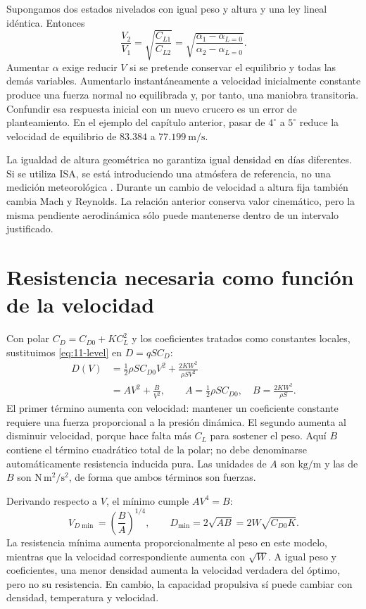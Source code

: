 Supongamos dos estados nivelados con igual peso y altura y una ley lineal idéntica. Entonces
\begin{equation}\label{eq:11-alphav}
\frac{V_2}{V_1}=\sqrt{\frac{C_{L1}}{C_{L2}}}
=\sqrt{\frac{\alpha_1-\alpha_{L=0}}{\alpha_2-\alpha_{L=0}}}.
\end{equation}
Aumentar $\alpha$ exige reducir $V$ si se pretende conservar el equilibrio y todas las demás variables. Aumentarlo instantáneamente a velocidad inicialmente constante produce una fuerza normal no equilibrada y, por tanto, una maniobra transitoria. Confundir esa respuesta inicial con un nuevo crucero es un error de planteamiento. En el ejemplo del capítulo anterior, pasar de $4^\circ$ a $5^\circ$ reduce la velocidad de equilibrio de $83.384$ a $77.199\ \mathrm{m/s}$.

La igualdad de altura geométrica no garantiza igual densidad en días diferentes. Si se utiliza ISA, se está introduciendo una atmósfera de referencia, no una medición meteorológica \cite{ISA1976}. Durante un cambio de velocidad a altura fija también cambia Mach y Reynolds. La relación anterior conserva valor cinemático, pero la misma pendiente aerodinámica sólo puede mantenerse dentro de un intervalo justificado.

\section{Resistencia necesaria como función de la velocidad}
Con polar $C_D=C_{D0}+KC_L^2$ y los coeficientes tratados como constantes locales, sustituimos \eqref{eq:11-level} en $D=qSC_D$:
\begin{align}
D(V)&=\frac12\rho SC_{D0}V^2+
\frac{2KW^2}{\rho S V^2}\label{eq:11-dv}\\
&=AV^2+\frac{B}{V^2},\qquad
A=\tfrac12\rho SC_{D0},\quad B=\frac{2KW^2}{\rho S}.
\end{align}
El primer término aumenta con velocidad: mantener un coeficiente constante requiere una fuerza proporcional a la presión dinámica. El segundo aumenta al disminuir velocidad, porque hace falta más $C_L$ para sostener el peso. Aquí $B$ contiene el término cuadrático total de la polar; no debe denominarse automáticamente resistencia inducida pura. Las unidades de $A$ son $\mathrm{kg/m}$ y las de $B$ son $\mathrm{N\,m^2/s^2}$, de forma que ambos términos son fuerzas.

Derivando respecto a $V$, el mínimo cumple $AV^4=B$:
\begin{equation}\label{eq:11-dmin}
V_{D\min}=\left(\frac BA\right)^{1/4},\qquad
D_{\min}=2\sqrt{AB}=2W\sqrt{C_{D0}K}.
\end{equation}
La resistencia mínima aumenta proporcionalmente al peso en este modelo, mientras que la velocidad correspondiente aumenta con $\sqrt W$. A igual peso y coeficientes, una menor densidad aumenta la velocidad verdadera del óptimo, pero no su resistencia. En cambio, la capacidad propulsiva sí puede cambiar con densidad, temperatura y velocidad.

